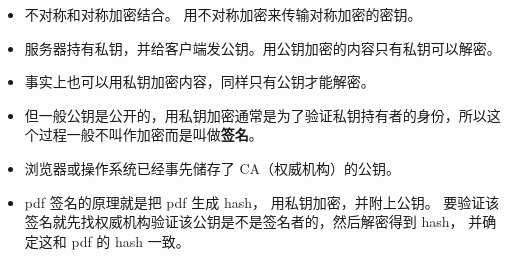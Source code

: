 
\begin{itemize}
\item 不对称和对称加密结合。 用不对称加密来传输对称加密的密钥。
\item 服务器持有私钥，并给客户端发公钥。用公钥加密的内容只有私钥可以解密。
\item 事实上也可以用私钥加密内容，同样只有公钥才能解密。
\item 但一般公钥是公开的，用私钥加密通常是为了验证私钥持有者的身份，所以这个过程一般不叫作加密而是叫做\textbf{签名}。

\item 浏览器或操作系统已经事先储存了 CA（权威机构）的公钥。

\item pdf 签名的原理就是把 pdf 生成 hash， 用私钥加密，并附上公钥。 要验证该签名就先找权威机构验证该公钥是不是签名者的，然后解密得到 hash， 并确定这和 pdf 的 hash 一致。
\end{itemize}

